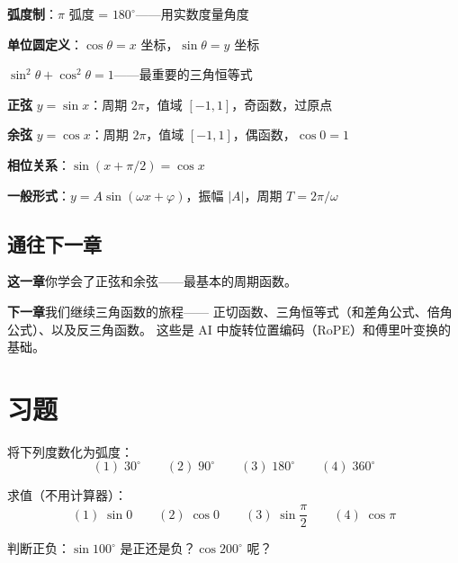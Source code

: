 \begin{progressbox}
\textbf{弧度制}：\(\pi\) 弧度 = \(180^\circ\)——用实数度量角度

\textbf{单位圆定义}：\(\cos\theta = x\) 坐标，\(\sin\theta = y\) 坐标

\(\sin^2 \theta + \cos^2 \theta = 1\)——最重要的三角恒等式

\textbf{正弦 }\(y = \sin x\)：周期 \(2\pi\)，值域 \([-1,1]\)，奇函数，过原点

\textbf{余弦 }\(y = \cos x\)：周期 \(2\pi\)，值域 \([-1,1]\)，偶函数，\(\cos 0 = 1\)

\textbf{相位关系}：\(\sin(x + \pi/2) = \cos x\)

\textbf{一般形式}：\(y = A \sin(\omega x + \varphi)\)，振幅 \(|A|\)，周期 \(T = 2\pi/\omega\)
\end{progressbox}

\subsection*{通往下一章}

\textbf{这一章}你学会了正弦和余弦——最基本的周期函数。

\textbf{下一章}我们继续三角函数的旅程——
正切函数、三角恒等式（和差角公式、倍角公式）、以及反三角函数。
这些是 AI 中旋转位置编码（RoPE）和傅里叶变换的基础。



\section{习题}


\begin{exercise}[0]
将下列度数化为弧度：
\[
(1)\; 30^\circ \qquad (2)\; 90^\circ \qquad (3)\; 180^\circ \qquad (4)\; 360^\circ
\]
\end{exercise}

\begin{exercise}[0]
求值（不用计算器）：
\[
(1)\; \sin 0 \qquad (2)\; \cos 0 \qquad (3)\; \sin \frac{\pi}{2} \qquad (4)\; \cos \pi
\]
\end{exercise}

\begin{exercise}[0]
判断正负：\(\sin 100^\circ\) 是正还是负？\(\cos 200^\circ\) 呢？
\end{exercise}

